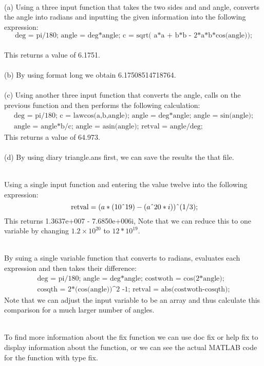 \documentclass[12pt]{article}
\newenvironment{answer}[2][Answer]{\begin{trivlist}
\item[\hskip \labelsep {\bfseries #1}\hskip \labelsep {\bfseries #2.}]}{\end{trivlist}}
\begin{document}
\begin{answer}{1}
\text{ }\\
(a) Using a three input function that takes the two sides and and angle, converts the angle into radians and inputting the given information into the following expression:\\
\[ \text{deg = pi/180; angle = deg*angle; c = sqrt( a*a + b*b - 2*a*b*cos(angle));} \]\\
This returns a value of 6.1751.\\
\text{ }\\
(b) By using format long we obtain 6.17508514718764.\\
\text{ }\\
(c) Using another three input function that converts the angle, calls on the previous function and then performs the following calculation:\\
\[ \begin{aligned}
\text{deg = pi/180; c = lawcos(a,b,angle); 
angle = deg*angle; angle = sin(angle);} \\
\text{
  angle = angle*b/c;
  angle = asin(angle);
  retval = angle/deg;}
  \end{aligned}
  \]
This returns a value of 64.973.\\
\text{ }\\
(d) By using diary triangle.ans first, we can save the results the that file.\\

\end{answer}

\begin{answer}{2}
\text{ }\\
Using a single input function and entering the value twelve into the following expression:
\[ \text{  retval} = (a*(10\string^ {19}) - (a\string^{20}*i))\string^(1/3); \]
This returns 1.3637e+007 - 7.6850e+006i, Note that we can reduce this to one variable by changing $1.2 \times 10^20$ to $12*10^19$.
\end{answer}

\begin{answer}{3}
\text{ }\\
By suing a single variable function that converts to radians, evaluates each expression and then takes their difference:
\[ 
\begin{aligned}
\text{
  deg = pi/180; 
  angle = deg*angle;
  costwoth = cos(2*angle);} \\
\text{
  cosqth = 2*(cos(angle))\textasciicircum2 -1;
  retval = abs(costwoth-cosqth);}
\end{aligned}
  \]
Note that we can adjust the input variable to be an array and thus calculate this comparison for a much larger number of angles.
  

\end{answer}

\begin{answer}{4}
\text{ }\\
To find more information about the fix function we can use doc fix or help fix to display information about the function, or we can see the actual MATLAB code for the function with type fix.\\ 
\end{answer}
\end{document}
